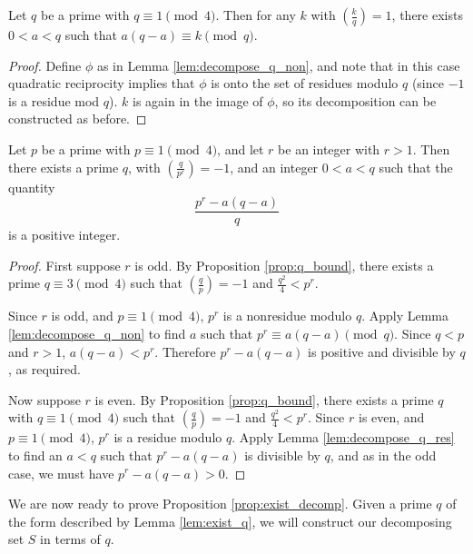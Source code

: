 \documentclass{amsart}
\begin{document}
\begin{lem}
  \label{lem:decompose_q_res}
  Let $q$ be a prime with $q \equiv 1 \pmod 4$. Then for any $k$
  with $\left( \frac{k}{q} \right) = 1$, there exists $0 < a < q$
  such that $a(q-a) \equiv k \pmod q$.
\end{lem}
\begin{proof}
  Define $\phi$ as in Lemma \ref{lem:decompose_q_non}, and note that in
  this case quadratic reciprocity implies that $\phi$ is onto the set
  of residues modulo $q$ (since $-1$ is a residue mod $q$). $k$ is
  again in the image of $\phi$, so its decomposition can be
  constructed as before.
\end{proof}

\begin{lem}
  \label{lem:exist_q}
  Let $p$ be a prime with $p \equiv 1 \pmod 4$, and let $r$ be an
  integer with $r > 1$. Then there exists a prime $q$, with $\left(
    \frac{q}{p^r} \right) = -1$, and an integer $0 < a < q$ such that
  the quantity
  \[\frac{p^r - a(q-a)}{q}\] 
  is a positive integer.
\end{lem}
\begin{proof}
  First suppose $r$ is odd. By Proposition \ref{prop:q_bound}, there
  exists a prime $q \equiv 3 \pmod 4$ such that $\left( \frac{q}{p}
  \right) = -1$ and $\frac{q^2}{4} < p^r$.

  Since $r$ is odd, and $p \equiv 1 \pmod 4$, $p^r$ is a nonresidue
  modulo $q$. Apply Lemma \ref{lem:decompose_q_non} to find $a$ such
  that $p^r \equiv a(q-a) \pmod q$. Since $q < p$ and $r > 1$,
  $a(q-a) < p^r$. Therefore $p^r - a(q-a)$ is positive and divisible
  by $q$, as required.

  Now suppose $r$ is even. By Proposition \ref{prop:q_bound}, there
  exists a prime $q$ with $q \equiv 1 \pmod 4$ such that $\left(
    \frac{q}{p} \right) = -1$ and $\frac{q^2}{4} < p^r$. Since $r$ is
  even, and $p \equiv 1 \pmod 4$, $p^r$ is a residue modulo $q$. Apply
  Lemma \ref{lem:decompose_q_res} to find an $a < q$ such that $p^r -
  a(q-a)$ is divisible by $q$, and as in the odd case, we must have
  $p^r - a(q-a) > 0$.
\end{proof}

We are now ready to prove Proposition \ref{prop:exist_decomp}. Given a
prime $q$ of the form described by Lemma \ref{lem:exist_q}, we will
construct our decomposing set $S$ in terms of $q$. 
\end{document}

